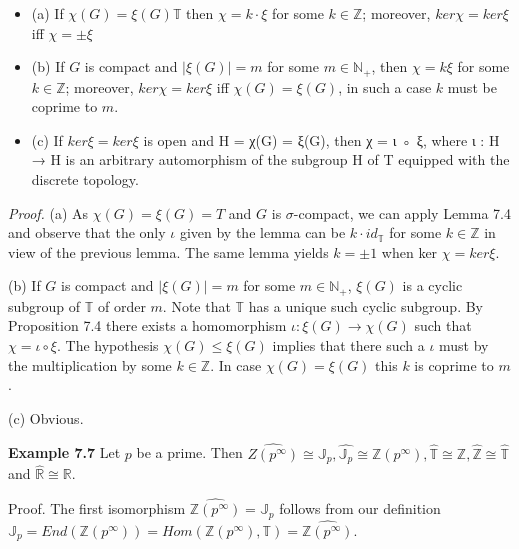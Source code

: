 \documentclass[12pt]{article}
\begin{document}
\begin{itemize}

    \item (a) If $\chi(G) = \xi(G) \mathbb{T}$ then $\chi = k · \xi$ for some $k \in \mathbb{Z}$; moreover, $ker \chi = ker \xi$ iff $\chi = \pm \xi$

    \item (b) If $G$ is compact and $|\xi (G)| = m$ for some $m \in \mathbb{N}_+$, then $\chi = k \xi$ for some $k \in \mathbb{Z}$; moreover, $ker \chi = ker \xi$
    iff $\chi(G) = \xi(G)$, in such a case $k$ must be coprime to $m$.

    \item (c) If $ker \xi = ker \xi$ is open and H = χ(G) = ξ(G), then χ = ι ◦ ξ, where ι : H → H is an arbitrary
    automorphism of the subgroup H of T equipped with the discrete topology.    

\end{itemize}


\emph{Proof.} (a) As $\chi (G) = \xi (G) = T$ and $G$ is $\sigma$-compact, we can apply Lemma 7.4 and observe that the only $\iota$ given
by the lemma can be $k · id_{\mathbb{T}}$ for some $k \in \mathbb{Z}$ in view of the previous lemma. The same lemma yields $k = \pm 1$
when ker $\chi = ker \xi$.


    (b) If $G$ is compact and $|\xi (G)| = m$ for some $m \in \mathbb{N}_+$, $\xi (G)$ is a cyclic subgroup of $\mathbb{T}$ of order $m$. Note that
$\mathbb{T}$ has a unique such cyclic subgroup. By Proposition 7.4 there exists a homomorphism $\iota : \xi (G) \to \chi (G)$ such
that $\chi = \iota \circ \xi$. The hypothesis $\chi (G) \leq \xi (G)$ implies that there such a $\iota$ must by the multiplication by some
$k \in \mathbb{Z}$. In case $\chi (G) = \xi (G)$ this $k$ is coprime to $m$.


    (c) Obvious.


\textbf{Example 7.7} Let $p$ be a prime. Then $\hat{Z(p^{\infty})} \cong \mathbb{J}_p, \hat{\mathbb{J}_p} \cong \mathbb{Z}(p^{\infty}), \hat{\mathbb{T}} \cong \mathbb{Z}, \hat{\mathbb{Z}} \cong \hat{\mathbb{T}}$ and $\hat{\mathbb{R}} \cong \mathbb{R}$.


Proof. The first isomorphism $\hat{\mathbb{Z}(p^{\infty})} = \mathbb{J}_p$ follows from our definition $\mathbb{J}_p = End(\mathbb{Z}(p^{\infty})) = Hom(\mathbb{Z}(p^{\infty}),\mathbb{T}) = \hat{\mathbb{Z}(p^{\infty})}$.
\end{document}
